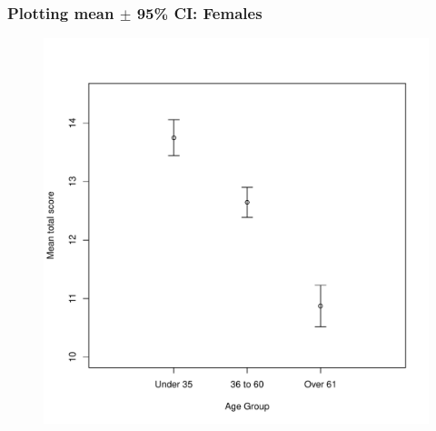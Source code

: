 \documentclass{beamer}\usepackage[]{graphicx}\usepackage[]{color}
\begin{document}
\begin{frame}[fragile]
  \frametitle{Plotting mean $\pm$ 95\% CI: Females}

\begin{figure}[h]
  \vspace{-20pt}
  \centering
  \includegraphics[height = 0.7\textwidth, keepaspectratio]{Figure/m6}
  \label{fig:m6}
\end{figure}
\end{frame} 
\end{document}
